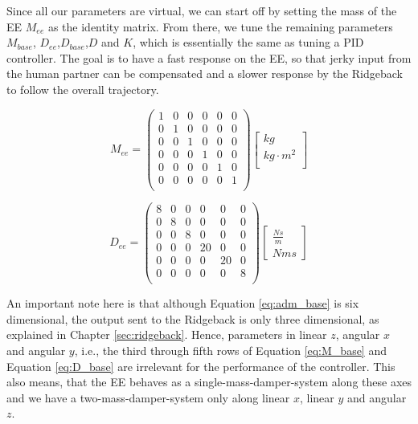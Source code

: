 Since all our parameters are virtual, we can start off by setting the mass of the EE $M_{ee}$ as the identity matrix. From there, we tune the remaining parameters $M_{base}$, $D_{ee}$,$D_{base}$,$D$ and $K$, which is essentially the same as tuning a PID controller. The goal is to have a fast response on the EE, so that jerky input from the human partner can be compensated and a slower response by the Ridgeback to follow the overall trajectory.

\begin{equation}
M_{ee} = \begin{pmatrix}
1 & 0 & 0 & 0 & 0 & 0 \\
0 & 1 & 0 & 0 & 0 & 0 \\
0 & 0 & 1 & 0 & 0 & 0 \\
0 & 0 & 0 & 1 & 0 & 0 \\
0 & 0 & 0 & 0 & 1 & 0 \\
0 & 0 & 0 & 0 & 0 & 1 \\
\end{pmatrix}
\begin{bmatrix}
kg \\
kg \cdot m^2 \\
\end{bmatrix}
\end{equation}

\begin{equation}
D_{ee} = \begin{pmatrix}
8 & 0 & 0 & 0 & 0 & 0 \\
0 & 8 & 0 & 0 & 0 & 0 \\
0 & 0 & 8 & 0 & 0 & 0 \\
0 & 0 & 0 & 20 & 0 & 0 \\
0 & 0 & 0 & 0 & 20 & 0 \\
0 & 0 & 0 & 0 & 0 & 8 \\
\end{pmatrix}
\begin{bmatrix}
\frac{N s}{m} \\
N m s
\end{bmatrix}
\end{equation}

An important note here is that although Equation \ref{eq:adm_base} is six dimensional, the output sent to the Ridgeback is only three dimensional, as explained in Chapter \ref{sec:ridgeback}. Hence, parameters in linear $z$, angular $x$ and angular $y$, i.e., the third through fifth rows of Equation \ref{eq:M_base} and Equation \ref{eq:D_base} are irrelevant for the performance of the controller. This also means, that the EE behaves as a single-mass-damper-system along these axes and we have a two-mass-damper-system only along linear $x$, linear $y$ and angular $z$.

